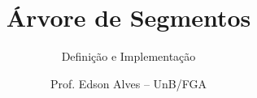 \title{Árvore de Segmentos}
\subtitle{Definição e Implementação}
\author{Prof. Edson Alves -- UnB/FGA}
\date{}

